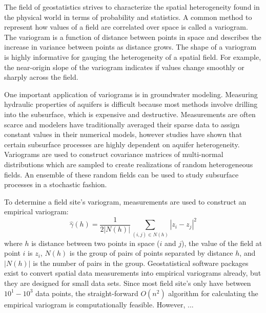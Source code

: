 

The field of geostatistics strives to characterize the spatial heterogeneity found in the physical world in terms of probability and statistics. A common method to represent how values of a field are correlated over space is called a variogram. The variogram is a function of distance between points in space and describes the increase in variance between points as distance grows. The shape of a variogram is highly informative for gauging the heterogeneity of a spatial field. For example, the near-origin slope of the variogram indicates if values change smoothly or sharply across the field. 

One important application of variograms is in groundwater modeling. Measuring hydraulic properties of aquifers is difficult because most methods involve drilling into the subsurface, which is expensive and destructive. Measurements are often scarce and modelers have traditionally averaged their sparse data to assign constant values in their numerical models, however studies have shown that certain subsurface processes are highly dependent on aquifer heterogeneity. Variograms are used to construct covariance matrices of multi-normal distributions which are sampled to create realizations of random heterogeneous fields. An ensemble of these random fields can be used to study subsurface processes in a stochastic fashion.      

To determine a field site's variogram, measurements are used to construct an empirical variogram: 
\begin{equation}
\hat{\gamma}(h)=\frac{1}{2|N(h)|}\sum_{(i,j)\in N(h)} |z_i-z_j|^2
\end{equation}
where $h$ is distance between two points in space ($i$ and $j$), the value of the field at point $i$ is $z_i$, $N(h)$ is the group of pairs of points separated by distance $h$, and $|N(h)|$ is the number of pairs in the group. Geostatistical software packages exist to convert spatial data measurements into empirical variograms already, but they are designed for small data sets. Since most field site's only have between $10^1 - 10^3$ data points, the straight-forward $O(n^2)$ algorithm for calculating the empirical variogram is computationally feasible. However, ...  

